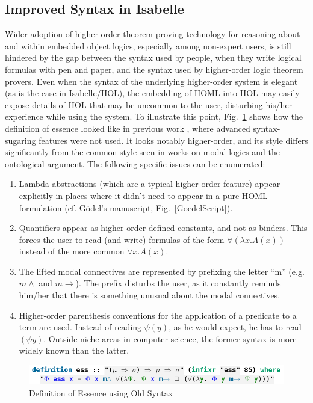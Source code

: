 \documentclass{article}
\newcommand{\imp}{\rightarrow}
\begin{document}
\subsection{Improved Syntax in Isabelle}\label{sec:improvedsyntax}

Wider adoption of higher-order theorem proving technology for reasoning about and within embedded object logics, especially among non-expert users, is still hindered by the gap between the syntax used by people, when they write logical formulas with pen and paper, and the syntax used by higher-order logic theorem provers. Even when the syntax of the underlying higher-order system is elegant (as is the case in Isabelle/HOL), the embedding of HOML into HOL may easily expose details of HOL that may be uncommon to the user, disturbing his/her experience while using the system. To illustrate this point, Fig.~\ref{UglyEssence} shows how the definition of essence looked like in previous work \cite{J28}, where advanced syntax-sugaring features were not used. It looks notably higher-order, and its style differs significantly from the common style seen in works on modal logics and the ontological argument. The following specific issues can be enumerated:
\begin{enumerate}
\item Lambda abstractions (which are a typical higher-order feature) appear explicitly in places where it didn't need to appear in a pure HOML formulation (cf. G\"odel's manuscript, Fig.~\ref{GoedelScript}).
\item Quantifiers appear as higher-order defined constants, and not as binders. This forces the user to read (and write) formulas of the form $\forall (\lambda x. A(x))$ instead of the more common $\forall x. A(x)$.
\item The lifted modal connectives are represented by prefixing the letter ``m'' (e.g. $m\wedge$ and $m\imp$). The prefix disturbs the user, as it constantly reminds him/her that there is something unusual about the modal connectives.
\item Higher-order parenthesis conventions for the application of a predicate to a term are used. 
Instead of reading $\psi(y)$, as he would expect, he has to read $(\psi y)$. Outside niche areas in computer science, the former syntax is more widely known than the latter.
\end{enumerate}


\begin{figure}
\centerline{\includegraphics[width=\columnwidth]{./Images/UglyEssence.png}}
\caption{ Definition of Essence using Old Syntax } \label{UglyEssence}
\end{figure}
\end{document}
